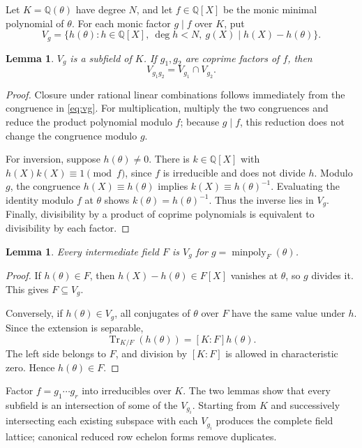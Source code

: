 \documentclass[11pt,a4paper]{article}
\newcommand{\Q}{\mathbb Q}
\newcommand{\Tr}{\operatorname{Tr}}
\newtheorem{lemma}[theorem]{Lemma}
\theoremstyle{remark}\newtheorem{remark}[theorem]{Remark}
\begin{document}
Let $K=\Q(\theta)$ have degree $N$, and let $f\in\Q[X]$ be the monic minimal polynomial of $\theta$. For each monic factor $g\mid f$ over $K$, put
\begin{equation}
 V_g=\{h(\theta):h\in\Q[X],\ \deg h<N,\
                 g(X)\mid h(X)-h(\theta)\}.
 \label{eq:vg}
\end{equation}

\begin{lemma}
$V_g$ is a subfield of $K$. If $g_1,g_2$ are coprime factors of $f$, then
\[
 V_{g_1g_2}=V_{g_1}\cap V_{g_2}.
\]
\end{lemma}
\begin{proof}
Closure under rational linear combinations follows immediately from the congruence in \eqref{eq:vg}. For multiplication, multiply the two congruences and reduce the product polynomial modulo $f$; because $g\mid f$, this reduction does not change the congruence modulo $g$.

For inversion, suppose $h(\theta)\ne0$. There is $k\in\Q[X]$ with $h(X)k(X)\equiv1\pmod f$, since $f$ is irreducible and does not divide $h$. Modulo $g$, the congruence $h(X)\equiv h(\theta)$ implies $k(X)\equiv h(\theta)^{-1}$. Evaluating the identity modulo $f$ at $\theta$ shows $k(\theta)=h(\theta)^{-1}$. Thus the inverse lies in $V_g$. Finally, divisibility by a product of coprime polynomials is equivalent to divisibility by each factor.
\end{proof}

\begin{lemma}
Every intermediate field $F$ is $V_g$ for $g=\operatorname{minpoly}_F(\theta)$.
\end{lemma}
\begin{proof}
If $h(\theta)\in F$, then $h(X)-h(\theta)\in F[X]$ vanishes at $\theta$, so $g$ divides it. This gives $F\subseteq V_g$.

Conversely, if $h(\theta)\in V_g$, all conjugates of $\theta$ over $F$ have the same value under $h$. Since the extension is separable,
\[
 \Tr_{K/F}(h(\theta))=[K:F]h(\theta).
\]
The left side belongs to $F$, and division by $[K:F]$ is allowed in characteristic zero. Hence $h(\theta)\in F$.
\end{proof}

Factor $f=g_1\cdots g_r$ into irreducibles over $K$. The two lemmas show that every subfield is an intersection of some of the $V_{g_i}$. Starting from $K$ and successively intersecting each existing subspace with each $V_{g_i}$ produces the complete field lattice; canonical reduced row echelon forms remove duplicates.
\end{document}
